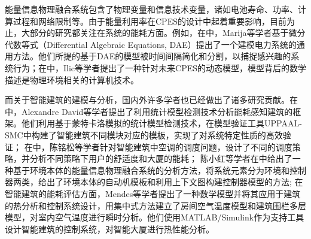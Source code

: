 	能量信息物理融合系统包含了物理变量和信息技术变量，诸如电池寿命、功率、计算过程和网络限制等。由于能量利用率在CPES的设计中起着重要影响，目前为止，大部分的研究都关注在系统的能耗方面。例如，在\citep{DBLP:journals/pieee/Ilic07}中，Marija等学者基于微分代数等式（Differential Algebraic Equations, DAE）提出了一个建模电力系统的通用方法。他们所提的基于DAE的模型被时间间隔简化和分割，以捕捉感兴趣的系统行为；在\citep{DBLP:journals/tsmc/IlicXKM10}中，Ilic等学者提出了一种针对未来CPES的动态模型，模型背后的数学描述是物理环境相关的计算机技术。	
	
	而关于智能建筑的建模与分析，国内外许多学者也已经做出了诸多研究贡献。在 \citep{DBLP:journals/chinaf/DavidDLMS12}中，Alexandre David等学者提出了利用统计模型检测技术分析能耗感知建筑的框架。他们利用基于蒙特卡洛模拟的统计模型检测技术，在模型验证工具UPPAAL-SMC中构建了智能建筑不同模块对应的模板，实现了对系统特定性质的高效验证；
	在\citep{不确定环境下智能大厦空调系统调度策略评估}中，陈铭松等学者针对智能建筑中空调的调度问题，设计了不同的调度策略，并分析不同策略下用户的舒适度和大厦的能耗；
	陈小红等学者在\citep{DBLP:conf/compsac/ChenGCDLS15}中给出了一种基于环境本体的能量信息物理融合系统的分析方法，将系统元素分为环境和控制器两类，给出了环境本体的自动机模板和利用上下文图构建控制器模型的方法;
	在智能建筑的能耗评估方面，Mendes等学者\citep{Mendes2001Building}提出了一种数学模型并将其应用于建筑的热分析和控制系统设计，用集中式方法建立了房间空气温度模型和建筑围栏多层模型，对室内空气温度进行瞬时分析。他们使用MATLAB/Simulink作为支持工具设计智能建筑的控制系统，对智能大厦进行热性能分析。

